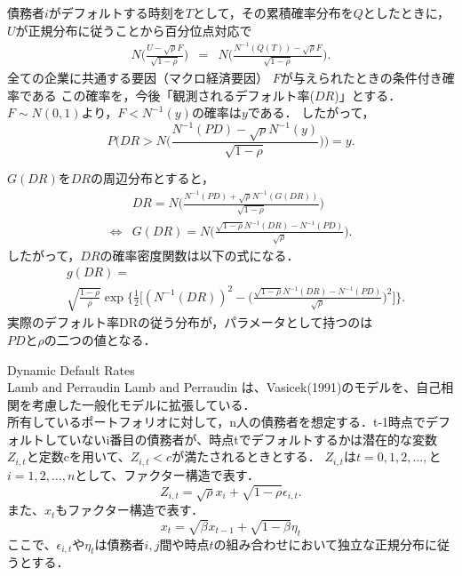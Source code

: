 \documentclass[dvipdfmx]{beamer}
\begin{document}
\begin{frame}{}
債務者$i$がデフォルトする時刻を$T$として，その累積確率分布を$Q$としたときに，$U$が正規分布に従うことから百分位点対応で
\begin{eqnarray*}
N\biggl(\frac{U-\sqrt{\rho}F}{\sqrt{1-\rho}}\biggr)&=&N\biggl(\frac{N^{-1}(Q(T))-\sqrt{\rho}F}{\sqrt{1-\rho}}\biggr). 
\end{eqnarray*}
全ての企業に共通する要因（マクロ経済要因） $F$が与えられたときの条件付き確率である
この確率を，今後「観測されるデフォルト率({$DR$})」とする．
$F\sim N(0,1)$より，$F<N^{-1}(y)$の確率は$y$である．
したがって，
{\small
\begin{equation}
P\biggl(DR>N\biggl(\frac{N^{-1}(PD)-\sqrt{\rho}N^{-1}(y)}{\sqrt{1-\rho}}\biggr)\biggr)=y.\nonumber
\end{equation}
}
\end{frame}
\begin{frame}{}
$G(DR)$を$DR$の周辺分布とすると，
\begin{eqnarray*}
\label{eq:eq14}
&DR = N \biggl(\frac{N^{-1}(PD)+\sqrt{\rho}N^{-1}(G(DR))}{\sqrt{1-\rho}} \biggr)\\ 
\Longleftrightarrow&G(DR) = N \biggl(\frac{\sqrt{1-\rho}N^{-1}(DR)-N^{-1}(PD)}{\sqrt{\rho}} \biggr).
\end{eqnarray*}
したがって，$DR$の確率密度関数は以下の式になる．
\begin{eqnarray*}
\label{eq:eq16}
&g(DR)=\\
&\sqrt{\frac{1- {\rho}}{ {\rho}}} \exp\biggl\{ \frac{1}{2} \biggl[ (N^{-1}(DR))^2 - \biggl( \frac{\sqrt{1- {\rho}}N^{-1}(DR)-N^{-1}({PD})}{\sqrt{ {\rho}}}\biggr)^2\biggr]\biggr\}.
\end{eqnarray*}
実際のデフォルト率DRの従う分布が，パラメータとして持つのは\\
$PD$と$\rho$の二つの値となる．
\end{frame}


\begin{frame}{Dynamic Default Rates \\Lamb and Perraudin }
Lamb and Perraudin は、Vasicek(1991)のモデルを、自己相関を考慮した一般化モデルに拡張している．\\
所有しているポートフォリオに対して，n人の債務者を想定する．t-1時点でデフォルトしていないi番目の債務者が、時点tでデフォルトするかは潜在的な変数$Z_{i,t}$と定数cを用いて、$Z_{i,t}<c$が満たされるときとする．
$Z_{i,t}$は$t=0,1,2,\dots,$と$i=1,2,\dots,n$として、ファクター構造で表す．\\

\begin{equation}
Z_{i,t}=\sqrt{\rho}x_i+\sqrt{1-\rho}\epsilon_{i,t}.\nonumber
\label{eq:factor_1}
\end{equation}
また、$x_t$もファクター構造で表す．
\begin{equation}
x_{t}=\sqrt{\beta}x_{t-1}+\sqrt{1-\beta}\eta_t\nonumber
\label{eq:autocorrelation}
\end{equation}
ここで、$\epsilon_{i,t}$や$\eta_t$は債務者$i,j$間や時点$t$の組み合わせにおいて独立な正規分布に従うとする．
\end{frame}
\end{document}

